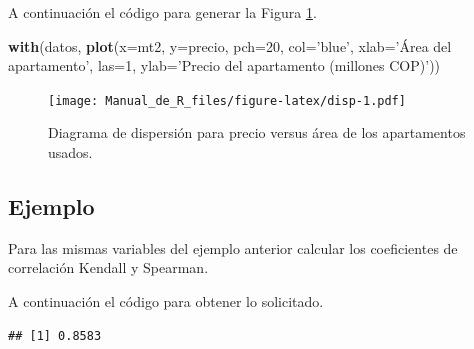 \documentclass[10pt,]{krantz}
\makeatletter
\newenvironment{Shaded}{\begin{snugshade}}{\end{snugshade}}
\newcommand{\KeywordTok}[1]{\textcolor[rgb]{0.13,0.29,0.53}{\textbf{{#1}}}}
\newcommand{\DataTypeTok}[1]{\textcolor[rgb]{0.13,0.29,0.53}{{#1}}}
\newcommand{\DecValTok}[1]{\textcolor[rgb]{0.00,0.00,0.81}{{#1}}}
\newcommand{\StringTok}[1]{\textcolor[rgb]{0.31,0.60,0.02}{{#1}}}
\newcommand{\NormalTok}[1]{{#1}}
\newenvironment{kframe}{%
\medskip{}
\setlength{\fboxsep}{.8em}
 \def\at@end@of@kframe{}%
 \ifinner\ifhmode%
  \def\at@end@of@kframe{\end{minipage}}%
  \begin{minipage}{\columnwidth}%
 \fi\fi%
 \def\FrameCommand##1{\hskip\@totalleftmargin \hskip-\fboxsep
 \colorbox{shadecolor}{##1}\hskip-\fboxsep
     \hskip-\linewidth \hskip-\@totalleftmargin \hskip\columnwidth}%
 \MakeFramed {\advance\hsize-\width
   \@totalleftmargin\z@ \linewidth\hsize
   \@setminipage}}%
 {\par\unskip\endMakeFramed%
 \at@end@of@kframe}
\renewenvironment{Shaded}{\begin{kframe}}{\end{kframe}}
\makeatother
\begin{document}
A continuación el código para generar la Figura \ref{fig:disp}.

\begin{Shaded}
\begin{Highlighting}[]
\KeywordTok{with}\NormalTok{(datos, }\KeywordTok{plot}\NormalTok{(}\DataTypeTok{x=}\NormalTok{mt2, }\DataTypeTok{y=}\NormalTok{precio, }\DataTypeTok{pch=}\DecValTok{20}\NormalTok{, }\DataTypeTok{col=}\StringTok{'blue'}\NormalTok{,}
                 \DataTypeTok{xlab=}\StringTok{'Área del apartamento'}\NormalTok{, }\DataTypeTok{las=}\DecValTok{1}\NormalTok{,}
                 \DataTypeTok{ylab=}\StringTok{'Precio del apartamento (millones COP)'}\NormalTok{))}
\end{Highlighting}
\end{Shaded}

\begin{figure}[htbp]
\centering
\texttt{[image: Manual\_de\_R\_files/figure-latex/disp-1.pdf]}
\caption{\label{fig:disp}Diagrama de dispersión para precio versus área de
los apartamentos usados.}
\end{figure}

\subsection*{Ejemplo}\label{ejemplo-44}


Para las mismas variables del ejemplo anterior calcular los coeficientes
de correlación Kendall y Spearman.

A continuación el código para obtener lo solicitado.

\begin{Shaded}
\end{Shaded}

\begin{verbatim}
## [1] 0.8583
\end{verbatim}

\begin{Shaded}
\end{Shaded}
\end{document}
